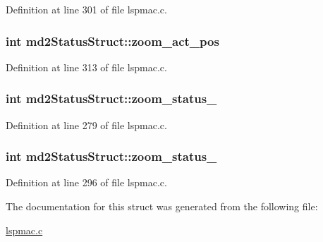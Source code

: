Definition at line 301 of file lspmac.\-c.

\hypertarget{structmd2StatusStruct_a920b80e9f5f08aedac3ad541d5ffc8ae}{
\subsubsection[{zoom\-\_\-act\-\_\-pos}]{\setlength{\rightskip}{0pt plus 5cm}int md2\-Status\-Struct\-::zoom\-\_\-act\-\_\-pos}}\label{structmd2StatusStruct_a920b80e9f5f08aedac3ad541d5ffc8ae}


Definition at line 313 of file lspmac.\-c.

\hypertarget{structmd2StatusStruct_af28e978b761dc07eefed3971547cfd4d}{
\subsubsection[{zoom\-\_\-status\-\_\-1}]{\setlength{\rightskip}{0pt plus 5cm}int md2\-Status\-Struct\-::zoom\-\_\-status\-\_}}\label{structmd2StatusStruct_af28e978b761dc07eefed3971547cfd4d}


Definition at line 279 of file lspmac.\-c.

\hypertarget{structmd2StatusStruct_a34e4200315a083deb8a970e21bbbe277}{
\subsubsection[{zoom\-\_\-status\-\_\-2}]{\setlength{\rightskip}{0pt plus 5cm}int md2\-Status\-Struct\-::zoom\-\_\-status\-\_}}\label{structmd2StatusStruct_a34e4200315a083deb8a970e21bbbe277}


Definition at line 296 of file lspmac.\-c.



The documentation for this struct was generated from the following file\-:\begin{DoxyCompactItemize}
\item 
\hyperlink{lspmac_8c}{lspmac.\-c}\end{DoxyCompactItemize}
